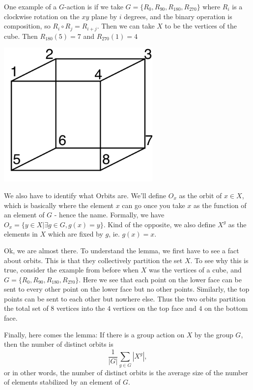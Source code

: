 \documentclass{article}
\begin{document}
One example of a $G$-action is if we take $G=\{R_0,R_{90},R_{180},R_{270}\}$  where $R_i$ is a clockwise rotation on the $xy$ plane by $i$ degrees, and the binary operation is composition, so $R_i \circ R_j = R_{i+j}.$ Then we can take $X$ to be the vertices of the cube. Then $R_{180}(5)=7$ and $R_{270}(1)=4$
\begin{center}
    \includegraphics[width=8cm, scale=1]{images/Labeled_cube_graph.png}
\end{center}


We also have to identify what Orbits are. We'll define $O_x$ as the orbit of $x\in X$, which is basically where the element $x$ can go once you take $x$ as the function of an element of $G$ - hence the name. Formally, we have $O_x=\{y\in X | \exists g\in G, g(x)=y\}.$ Kind of the opposite, we also define $X^g$ as the elements in $X$ which are fixed by $g$, ie. $g(x) = x$.

Ok, we are almost there. To understand the lemma, we first have to see a fact about orbits. This is that they collectively partition the set $X$. To see why this is true, consider the example from before when $X$ was the vertices of a cube, and $G=\{R_0,R_{90},R_{180},R_{270}\}$. Here we see that each point on the lower face can be sent to every other point on the lower face but no other points. Similarly, the top points can be sent to each other but nowhere else. Thus the two orbits partition the total set of $8$ vertices into the $4$ vertices on the top face and $4$ on the bottom face.

Finally, here comes the lemma: If there is a group action on $X$ by the group $G$, then the number of distinct orbits is $$\frac{1}{|G|}\sum_{g\in G}|X^g|,$$
or in other words, the number of distinct orbits is the average size of the number of elements stabilized by an element of $G$.
\end{document}
